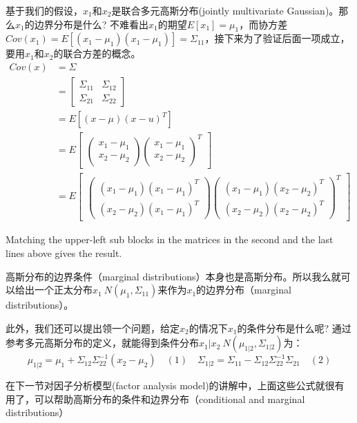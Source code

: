 \documentclass[14pt,a4paper]{article}
\begin{document}
\begin{spacing}{1.5}
基于我们的假设，$x_1$和$x_2$是联合多元高斯分布(jointly multivariate Gaussian)。那么$x_1$的边界分布是什么? 不难看出$x_1$的期望$E[x_1]=\mu_1$，而协方差$Cov(x_1)=E[(x_1-\mu_1)(x_1-\mu_1)]=\Sigma_{11}$，接下来为了验证后面一项成立，要用$x_1$和$x_2$的联合方差的概念。
$$
\begin{aligned}
Cov(x)&=\Sigma \\
&=\begin{bmatrix}
\Sigma_{11} & \Sigma_{12} \\
\Sigma_{21} & \Sigma_{22}
\end{bmatrix} \\
&=E[(x-\mu)(x-u)^{T}]\\
&=E\begin{bmatrix}
\begin{pmatrix}
x_1-\mu_1 \\ x_2-\mu_2
\end{pmatrix}
\begin{pmatrix}
x_1-\mu_1 \\ x_2-\mu_2
\end{pmatrix}^{T}
\end{bmatrix}\\
&=E\begin{bmatrix}
\begin{pmatrix}
(x_1-\mu_1)(x_1-\mu_1)^T \\ (x_2-\mu_2)(x_1-\mu_1)^T
\end{pmatrix}
\begin{pmatrix}
(x_1-\mu_1)(x_2-\mu_2)^T \\ (x_2-\mu_2)(x_2-\mu_2)^{T}
\end{pmatrix}^{T}
\end{bmatrix}
\end{aligned}
$$

Matching the upper-left sub blocks in the matrices in the second and the last lines above gives the result.

高斯分布的边界条件（marginal distributions）本身也是高斯分布。所以我么就可以给出一个正太分布$x_1~N(\mu_1,\Sigma_{11})$来作为$x_1$的边界分布（marginal distributions）。

此外，我们还可以提出领一个问题，给定$x_2$的情况下$x_1$的条件分布是什么呢? 通过参考多元高斯分布的定义，就能得到条件分布$x_1|x_2~N(\mu_{1|2},\Sigma_{1|2})$为：
$$
\mu_{1|2}=\mu_1+\Sigma_{12}\Sigma_{22}^{-1}(x_2-\mu_2) \quad(1)\quad
\Sigma_{1|2}=\Sigma_{11}-\Sigma_{12}\Sigma_{22}^{-1}\Sigma_{21}\quad(2)
$$

在下一节对因子分析模型(factor analysis model)的讲解中，上面这些公式就很有用了，可以帮助高斯分布的条件和边界分布（conditional and marginal distributions）


\end{spacing}
\end{document}
